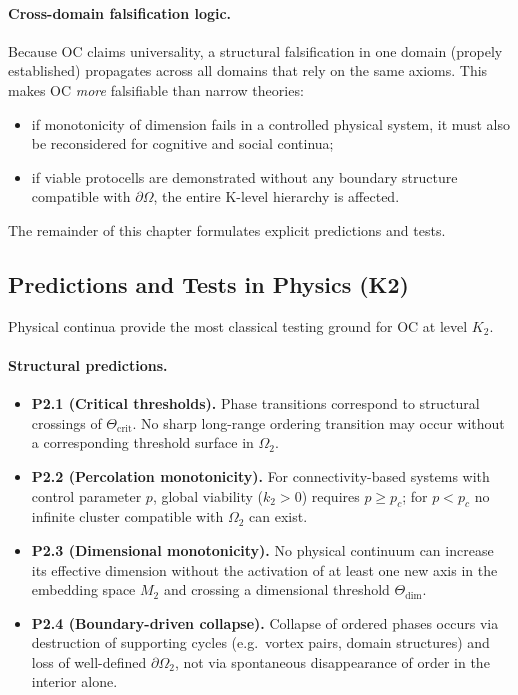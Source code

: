 \paragraph{Cross-domain falsification logic.}
Because OC claims universality, a structural falsification in one domain
(propely established) propagates across all domains that rely on the same
axioms.  This makes OC \emph{more} falsifiable than narrow theories:
\begin{itemize}
  \item if monotonicity of dimension fails in a controlled physical system,
        it must also be reconsidered for cognitive and social continua;
  \item if viable protocells are demonstrated without any boundary structure
        compatible with \(\partial\Omega\), the entire K-level hierarchy is
        affected.
\end{itemize}

The remainder of this chapter formulates explicit predictions and tests.

\subsection{Predictions and Tests in Physics (K2)}

Physical continua provide the most classical testing ground for OC at level
\(K_2\).

\paragraph{Structural predictions.}
\begin{itemize}
  \item \textbf{P2.1 (Critical thresholds).}
        Phase transitions correspond to structural crossings of
        \(\Theta_{\mathrm{crit}}\).  No sharp long-range ordering transition
        may occur without a corresponding threshold surface in \(\Omega_2\).
  \item \textbf{P2.2 (Percolation monotonicity).}
        For connectivity-based systems with control parameter \(p\),
        global viability (\(k_2>0\)) requires \(p \ge p_c\);
        for \(p<p_c\) no infinite cluster compatible with \(\Omega_2\)
        can exist.
  \item \textbf{P2.3 (Dimensional monotonicity).}
        No physical continuum can increase its effective dimension without
        the activation of at least one new axis in the embedding space \(M_2\)
        and crossing a dimensional threshold \(\Theta_{\mathrm{dim}}\).
  \item \textbf{P2.4 (Boundary-driven collapse).}
        Collapse of ordered phases occurs via destruction of supporting
        cycles (e.g.\ vortex pairs, domain structures) and loss of
        well-defined \(\partial\Omega_2\), not via spontaneous disappearance
        of order in the interior alone.
\end{itemize}

